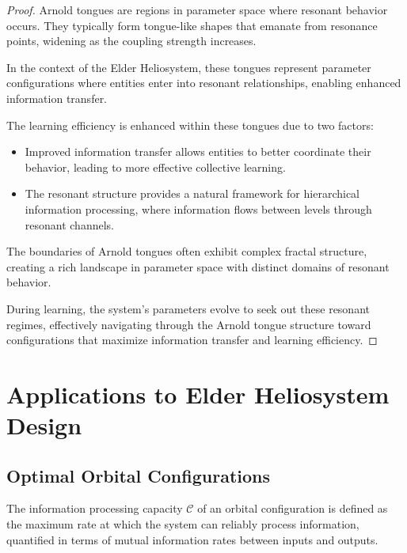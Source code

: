 \begin{proof}
Arnold tongues are regions in parameter space where resonant behavior occurs. They typically form tongue-like shapes that emanate from resonance points, widening as the coupling strength increases.

In the context of the Elder Heliosystem, these tongues represent parameter configurations where entities enter into resonant relationships, enabling enhanced information transfer.

The learning efficiency is enhanced within these tongues due to two factors:
\begin{itemize}
    \item Improved information transfer allows entities to better coordinate their behavior, leading to more effective collective learning.
    \item The resonant structure provides a natural framework for hierarchical information processing, where information flows between levels through resonant channels.
\end{itemize}

The boundaries of Arnold tongues often exhibit complex fractal structure, creating a rich landscape in parameter space with distinct domains of resonant behavior.

During learning, the system's parameters evolve to seek out these resonant regimes, effectively navigating through the Arnold tongue structure toward configurations that maximize information transfer and learning efficiency.
\end{proof}

\section{Applications to Elder Heliosystem Design}

\subsection{Optimal Orbital Configurations}

\begin{definition}
The information processing capacity $\mathcal{C}$ of an orbital configuration is defined as the maximum rate at which the system can reliably process information, quantified in terms of mutual information rates between inputs and outputs.
\end{definition}

